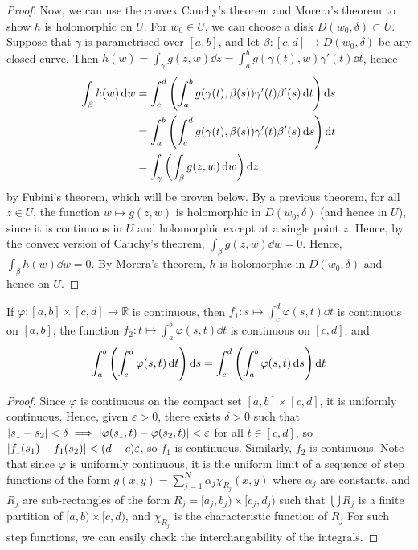 \begin{proof}
	Now, we can use the convex Cauchy's theorem and Morera's theorem to show \( h \) is holomorphic on \( U \).
	For \( w_0 \in U \), we can choose a disk \( D(w_0, \delta) \subset U \).
	Suppose that \( \gamma \) is parametrised over \( [a,b] \), and let \( \beta \colon [c,d] \to D(w_0,\delta) \) be any closed curve.
	Then \( h(w) = \int_\gamma g(z,w) \dd{z} = \int_a^b g(\gamma(t),w) \gamma'(t) \dd{t} \), hence
	\begin{align*}
		\int_\beta h(w) \dd{w} &= \int_c^d \qty(\int_a^b g(\gamma(t),\beta(s))\gamma'(t)\beta'(s) \dd{t})\dd{s} \\
		&= \int_a^b \qty(\int_c^d g(\gamma(t),\beta(s))\gamma'(t)\beta'(s) \dd{s})\dd{t} \\
		&= \int_\gamma \qty(\int_\beta g(z,w) \dd{w}) \dd{z}
	\end{align*}
	by Fubini's theorem, which will be proven below.
	By a previous theorem, for all \( z \in U \), the function \( w \mapsto g(z,w) \) is holomorphic in \( D(w_0, \delta) \) (and hence in \( U \)), since it is continuous in \( U \) and holomorphic except at a single point \( z \).
	Hence, by the convex version of Cauchy's theorem, \( \int_\beta g(z,w) \dd{w} = 0 \).
	Hence, \( \int_\beta h(w) \dd{w} = 0 \).
	By Morera's theorem, \( h \) is holomorphic in \( D(w_0, \delta) \) and hence on \( U \).
\end{proof}
\begin{lemma}
	If \( \varphi \colon [a,b] \times [c,d] \to \mathbb R \) is continuous, then \( f_1 \colon s \mapsto \int_c^d \varphi(s,t) \dd{t} \) is continuous on \( [a,b] \), the function \( f_2 \colon t \mapsto \int_a^b \varphi(s,t) \dd{t} \) is continuous on \( [c,d] \), and
	\[ \int_a^b \qty( \int_c^d \varphi(s,t) \dd{t} ) \dd{s} = \int_c^d \qty( \int_a^b \varphi(s,t) \dd{s} ) \dd{t} \]
\end{lemma}
\begin{proof}
	Since \( \varphi \) is continuous on the compact set \( [a,b] \times [c,d] \), it is uniformly continuous.
	Hence, given \( \varepsilon > 0 \), there exists \( \delta > 0 \) such that \( \abs{s_1 - s_2} < \delta \implies \abs{\varphi(s_1, t) - \varphi(s_2, t)} < \varepsilon \) for all \( t \in [c,d] \), so \( \abs{f_1(s_1) - f_1(s_2)} < (d-c) \varepsilon \), so \( f_1 \) is continuous.
	Similarly, \( f_2 \) is continuous.
	Note that since \( \varphi \) is uniformly continuous, it is the uniform limit of a sequence of step functions of the form \( g(x,y) = \sum_{j=1}^N \alpha_j \chi_{R_j}(x,y) \) where \( \alpha_j \) are constants, and \( R_j \) are sub-rectangles of the form \( R_j = [a_j, b_j) \times [c_j, d_j) \) such that \( \bigcup R_j \) is a finite partition of \( [a,b) \times [c,d) \), and \( \chi_{R_j} \) is the characteristic function of \( R_j \)
	For such step functions, we can easily check the interchangability of the integrals.
\end{proof}

